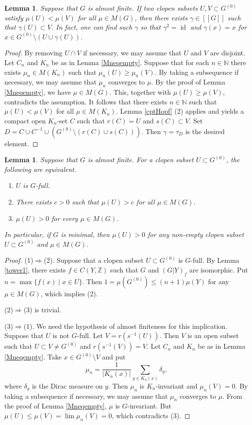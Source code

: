 \documentclass[11pt]{article}
\newtheorem{lem}[thm]{Lemma}
\theoremstyle{definition}
\newcommand{\id}{\operatorname{id}}
\newcommand{\N}{\mathbb{N}}
\newcommand{\Z}{\mathbb{Z}}
\begin{document}
\begin{lem}\label{Blackadar}
Suppose that $G$ is almost finite. 
If two clopen subsets $U,V\subset G^{(0)}$ satisfy 
$\mu(U)<\mu(V)$ for all $\mu\in M(G)$, then 
there exists $\gamma\in[[G]]$ such that $\gamma(U)\subset V$. 
In fact, one can find such $\gamma$ so that 
$\gamma^2=\id$ and $\gamma(x)=x$ for $x\in G^{(0)}\setminus(U\cup\gamma(U))$. 
\end{lem}
\begin{proof}
By removing $U\cap V$ if necessary, 
we may assume that $U$ and $V$ are disjoint. 
Let $C_n$ and $K_n$ be as in Lemma \ref{Mneqempty}. 
Suppose that for each $n\in\N$ 
there exists $\mu_n\in M(K_n)$ such that $\mu_n(U)\geq\mu_n(V)$. 
By taking a subsequence if necessary, 
we may assume that $\mu_n$ converges to $\mu$. 
By the proof of Lemma \ref{Mneqempty}, we have $\mu\in M(G)$. 
This, together with $\mu(U)\geq\mu(V)$, contradicts the assumption. 
It follows that 
there exists $n\in\N$ such that 
$\mu(U)<\mu(V)$ for all $\mu\in M(K_n)$. 
Lemma \ref{cptHopf} (2) applies and yields 
a compact open $K_n$-set $C$ such that $r(C)=U$ and $s(C)\subset V$. 
Set $D=C\cup C^{-1}\cup(G^{(0)}\setminus(r(C)\cup s(C)))$. 
Then $\gamma=\tau_D$ is the desired element. 
\end{proof}

\begin{lem}\label{Gfull}
Suppose that $G$ is almost finite. 
For a clopen subset $U\subset G^{(0)}$, 
the following are equivalent. 
\begin{enumerate}
\item $U$ is $G$-full. 
\item There exists $c>0$ such that $\mu(U)>c$ for all $\mu\in M(G)$. 
\item $\mu(U)>0$ for every $\mu\in M(G)$. 
\end{enumerate}
In particular, if $G$ is minimal, then $\mu(U)>0$ 
for any non-empty clopen subset $U\subset G^{(0)}$ and $\mu\in M(G)$. 
\end{lem}
\begin{proof}
(1)$\Rightarrow$(2). 
Suppose that a clopen subset $U\subset G^{(0)}$ is $G$-full. 
By Lemma \ref{tower1}, there exists $f\in C(Y,\Z)$ such that 
$G$ and $(G|Y)_f$ are isomorphic. 
Put $n=\max\{f(x)\mid x\in U\}$.
Then $1=\mu(G^{(0)})\leq(n+1)\mu(Y)$ for any $\mu\in M(G)$, 
which implies (2). 

(2)$\Rightarrow$(3) is trivial. 

(3)$\Rightarrow$(1). 
We need the hypothesis of almost finiteness for this implication. 
Suppose that $U$ is not $G$-full. 
Let $V=r(s^{-1}(U))$. 
Then $V$ is an open subset such that 
$U\subset V\neq G^{(0)}$ and $r(s^{-1}(V))=V$. 
Let $C_n$ and $K_n$ be as in Lemma \ref{Mneqempty}. 
Take $x\in G^{(0)}\setminus V$ and put 
\[
\mu_n=\frac{1}{\lvert K_n(x)\rvert}\sum_{y\in K_n(x)}\delta_y, 
\]
where $\delta_y$ is the Dirac measure on $y$. 
Then $\mu_n$ is $K_n$-invariant and $\mu_n(V)=0$. 
By taking a subsequence if necessary, 
we may assume that $\mu_n$ converges to $\mu$. 
From the proof of Lemma \ref{Mneqempty}, $\mu$ is $G$-invariant. 
But $\mu(U)\leq\mu(V)=\lim\mu_n(V)=0$, which contradicts (3). 
\end{proof}
\end{document}
